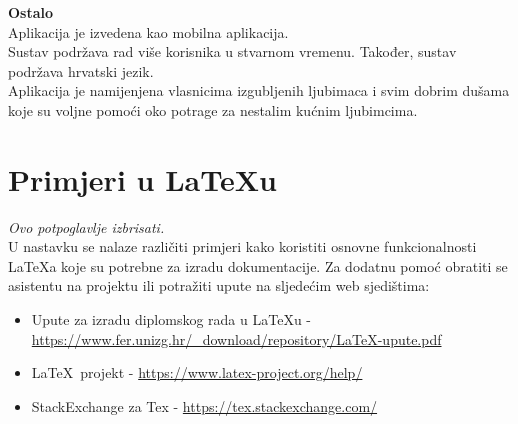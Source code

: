 		\textbf{Ostalo}\\
		Aplikacija je izvedena kao mobilna aplikacija.\\
		Sustav podržava rad više korisnika u stvarnom vremenu. Također, sustav podržava hrvatski jezik.\\
		Aplikacija je namijenjena vlasnicima izgubljenih ljubimaca i svim dobrim dušama koje su voljne pomoći oko potrage za nestalim kućnim ljubimcima.
		
		\eject
		
		\section{Primjeri u \LaTeX u}
		
		\textit{Ovo potpoglavlje izbrisati.}\\

		U nastavku se nalaze različiti primjeri kako koristiti osnovne funkcionalnosti \LaTeX a koje su potrebne za izradu dokumentacije. Za dodatnu pomoć obratiti se asistentu na projektu ili potražiti upute na sljedećim web sjedištima:
		\begin{itemize}
			\item Upute za izradu diplomskog rada u \LaTeX u - \url{https://www.fer.unizg.hr/_download/repository/LaTeX-upute.pdf}
			\item \LaTeX\ projekt - \url{https://www.latex-project.org/help/}
			\item StackExchange za Tex - \url{https://tex.stackexchange.com/}\\
		
		\end{itemize} 	


